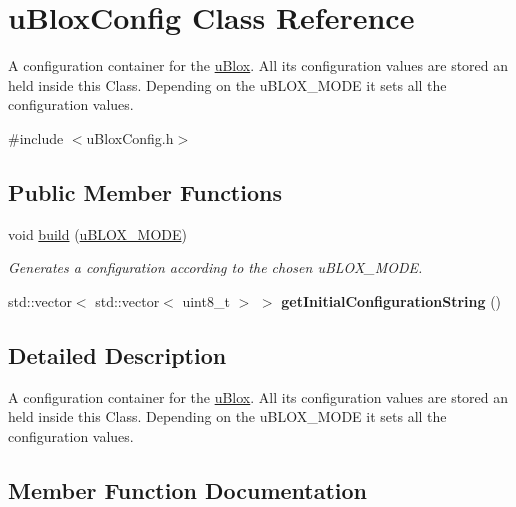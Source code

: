 \hypertarget{classu_blox_config}{}\section{u\+Blox\+Config Class Reference}
\label{classu_blox_config}


A configuration container for the \hyperlink{classu_blox}{u\+Blox}. All its configuration values are stored an held inside this Class. Depending on the u\+B\+L\+O\+X\+\_\+\+M\+O\+D\+E it sets all the configuration values.  




{\ttfamily \#include $<$u\+Blox\+Config.\+h$>$}

\subsection*{Public Member Functions}
\begin{DoxyCompactItemize}
\item 
void \hyperlink{classu_blox_config_acc12faef4882920b3eb74f5cae28dc4c}{build} (\hyperlink{u_blox_config_8h_a6385c8c7bdf45fd188525597db9b7314}{u\+B\+L\+O\+X\+\_\+\+M\+O\+D\+E})
\begin{DoxyCompactList}\small\item\em Generates a configuration according to the chosen u\+B\+L\+O\+X\+\_\+\+M\+O\+D\+E. \end{DoxyCompactList}\item 
\hypertarget{classu_blox_config_a16f5ca8d7506ecdb1bca3f6add5eea88}{}std\+::vector$<$ std\+::vector$<$ uint8\+\_\+t $>$ $>$ {\bfseries get\+Initial\+Configuration\+String} ()\label{classu_blox_config_a16f5ca8d7506ecdb1bca3f6add5eea88}

\end{DoxyCompactItemize}


\subsection{Detailed Description}
A configuration container for the \hyperlink{classu_blox}{u\+Blox}. All its configuration values are stored an held inside this Class. Depending on the u\+B\+L\+O\+X\+\_\+\+M\+O\+D\+E it sets all the configuration values. 

\subsection{Member Function Documentation}
\hypertarget{classu_blox_config_acc12faef4882920b3eb74f5cae28dc4c}{}
